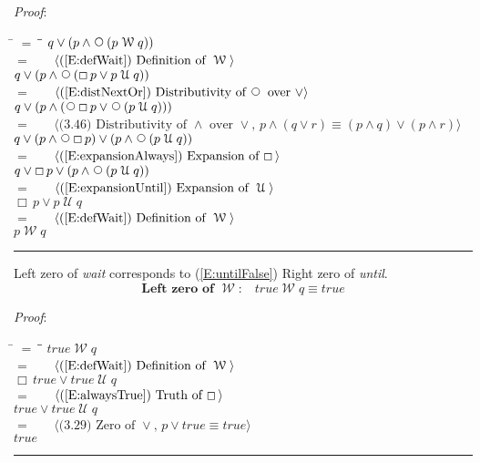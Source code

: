 \documentclass[12pt, fleqn, leqno]{article}
\newcommand{\lgap}{2pt}                             %
\newcommand{\mymathindent}{24pt}                    %
\newcommand{\Until}{\;\mathcal{U}\;}
\newcommand{\Wait}{\;\mathcal{W}\;}
\newcommand{\Next}{\;\,\text{\raisebox{3.5pt}{\circle{6}}}}
\newcommand{\Always}{\Box\,}
\newcommand{\myqed}{\rule[-.23ex]{1.2ex}{2.0ex}}
\newcommand{\myqedtab}{\hspace{384pt}}              %
\newcommand{\Gll} {\langle}                         %
\newcommand{\Ggg} {\rangle}                         %
\newcommand{\Hint}[1]     {\ \ \ $\Gll              \mbox{#1} \Ggg$ }   %
\begin{document}
\emph{Proof}:
\begin{tabbing}
\hspace{\mymathindent} \= $= \;$ \= \myqedtab \= \kill
\> \> $q \lor (p \land \Next (p \Wait q))$\\[\lgap]
\> $=$ \> \Hint{(\ref{E:defWait}) Definition of $\Wait$} \\[\lgap]
\> \> $q \lor (p \land \Next (\Always p\lor p \Until q))$\\[\lgap]
\> $=$ \> \Hint{(\ref{E:distNextOr}) Distributivity of $\Next$ over $\lor$} \\[\lgap]
\> \> $q \lor (p \land (\Next\Always p\lor \Next (p \Until q)))$\\[\lgap]
\> $=$ \> \Hint{(3.46) Distributivity of $\land$ over $\lor$, $p\land (q\lor r)\equiv (p\land q)\lor (p\land r)$}\\[\lgap]
\> \> $q \lor (p \land \Next\Always p)\lor (p \land \Next(p \Until q))$\\[\lgap]
\> $=$ \> \Hint{(\ref{E:expansionAlways}) Expansion of $\Always$}\\[\lgap]
\> \> $q \lor \Always p\lor (p \land \Next(p \Until q))$\\[\lgap]
\> $=$ \> \Hint{(\ref{E:expansionUntil}) Expansion of $\Until$}\\[\lgap]
\> \> $\Always p\lor p \Until q$\\[\lgap]
\> $=$ \> \Hint{(\ref{E:defWait}) Definition of $\Wait$} \\[\lgap]
\> \> $p \Wait q$ \quad \myqed
\end{tabbing}

Left zero of \textit{wait} corresponds to (\ref{E:untilFalse}) Right zero of \textit{until}.
\begin{equation}\label{E:leftZeroWait}
\textbf{Left zero of $\Wait$:}\quad true \Wait q \equiv true
\end{equation}

\emph{Proof}:
\begin{tabbing}
\hspace{\mymathindent} \= $= \;$ \= \myqedtab \= \kill
\> \> $true \Wait q$\\[\lgap]
\> $=$ \> \Hint{(\ref{E:defWait}) Definition of $\Wait$} \\[\lgap]
\> \> $\Always true \lor true\Until q$\\[\lgap]
\> $=$ \> \Hint{(\ref{E:alwaysTrue}) Truth of $\Always$} \\[\lgap]
\> \> $true \lor true\Until q$\\[\lgap]
\> $=$ \> \Hint{(3.29) Zero of $\lor$, $p\lor true \equiv true$}\\[\lgap]
\> \> $true$ \quad \myqed
\end{tabbing}
\end{document}
